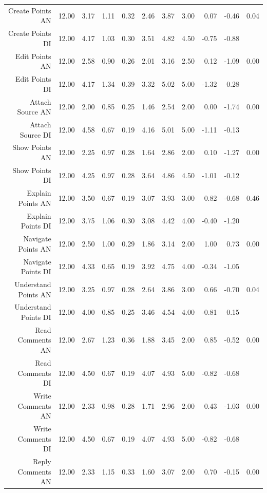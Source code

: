 \documentclass{sigchi}
\begin{document}
\begin{itemize}
\begin{itemize}
\begin{table}[ht]
\begin{tabular}{rrrrrrrrrrr}
Create Points AN & 12.00 & 3.17 & 1.11 & 0.32 & 2.46 & 3.87 & 3.00 & 0.07 & -0.46 & 0.04 \\ 
  Create Points DI & 12.00 & 4.17 & 1.03 & 0.30 & 3.51 & 4.82 & 4.50 & -0.75 & -0.88 &  \\ 
    \hline
  Edit Points AN & 12.00 & 2.58 & 0.90 & 0.26 & 2.01 & 3.16 & 2.50 & 0.12 & -1.09 & 0.00 \\ 
  Edit Points DI & 12.00 & 4.17 & 1.34 & 0.39 & 3.32 & 5.02 & 5.00 & -1.32 & 0.28 &  \\ 
    \hline
  Attach Source AN & 12.00 & 2.00 & 0.85 & 0.25 & 1.46 & 2.54 & 2.00 & 0.00 & -1.74 & 0.00 \\ 
  Attach Source DI & 12.00 & 4.58 & 0.67 & 0.19 & 4.16 & 5.01 & 5.00 & -1.11 & -0.13 &  \\ 
    \hline
  Show Points AN & 12.00 & 2.25 & 0.97 & 0.28 & 1.64 & 2.86 & 2.00 & 0.10 & -1.27 & 0.00 \\ 
  Show Points DI & 12.00 & 4.25 & 0.97 & 0.28 & 3.64 & 4.86 & 4.50 & -1.01 & -0.12 &  \\ 
  \hline
  Explain Points AN & 12.00 & 3.50 & 0.67 & 0.19 & 3.07 & 3.93 & 3.00 & 0.82 & -0.68 & 0.46 \\ 
  Explain Points DI & 12.00 & 3.75 & 1.06 & 0.30 & 3.08 & 4.42 & 4.00 & -0.40 & -1.20 &  \\ 
  \hline
  Navigate Points AN & 12.00 & 2.50 & 1.00 & 0.29 & 1.86 & 3.14 & 2.00 & 1.00 & 0.73 & 0.00 \\ 
  Navigate Points DI & 12.00 & 4.33 & 0.65 & 0.19 & 3.92 & 4.75 & 4.00 & -0.34 & -1.05 &  \\ 
  \hline
  Understand Points AN & 12.00 & 3.25 & 0.97 & 0.28 & 2.64 & 3.86 & 3.00 & 0.66 & -0.70 & 0.04 \\ 
  Understand Points DI & 12.00 & 4.00 & 0.85 & 0.25 & 3.46 & 4.54 & 4.00 & -0.81 & 0.15 &  \\ 
  \hline
  Read Comments AN & 12.00 & 2.67 & 1.23 & 0.36 & 1.88 & 3.45 & 2.00 & 0.85 & -0.52 & 0.00 \\ 
  Read Comments  DI & 12.00 & 4.50 & 0.67 & 0.19 & 4.07 & 4.93 & 5.00 & -0.82 & -0.68 &  \\ 
  \hline
  Write Comments AN & 12.00 & 2.33 & 0.98 & 0.28 & 1.71 & 2.96 & 2.00 & 0.43 & -1.03 & 0.00 \\ 
  Write Comments  DI & 12.00 & 4.50 & 0.67 & 0.19 & 4.07 & 4.93 & 5.00 & -0.82 & -0.68 &  \\ 
  \hline
  Reply Comments AN & 12.00 & 2.33 & 1.15 & 0.33 & 1.60 & 3.07 & 2.00 & 0.70 & -0.15 & 0.00 \\ 

\end{tabular}
\end{table}
\end{itemize}
\end{itemize}
\end{document}
